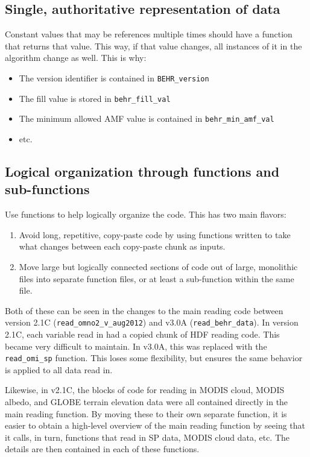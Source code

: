 \documentclass[12pt]{article}
\begin{document}
\subsection{Single, authoritative representation of data}
	Constant values that may be references multiple times should have a function that returns that value. This way, if that value changes, all instances of it in the algorithm change as well. This is why:
	\begin{itemize}
	\item The version identifier is contained in \lstinline$BEHR_version$
	\item The fill value is stored in \lstinline$behr_fill_val$
	\item The minimum allowed AMF value is contained in \lstinline$behr_min_amf_val$
	\item etc.
	\end{itemize}
	
	
\subsection{Logical organization through functions and sub-functions}
	Use functions to help logically organize the code. This has two main flavors:	
	\begin{enumerate}
	\item Avoid long, repetitive, copy-paste code by using functions written to take what changes between each copy-paste chunk as inputs.
	\item Move large but logically connected sections of code out of large, monolithic files into separate function files, or at least a sub-function within the same file.
	\end{enumerate} 
	
	Both of these can be seen in the changes to the main reading code between version 2.1C (\lstinline$read_omno2_v_aug2012$) and v3.0A (\lstinline$read_behr_data$). In version 2.1C, each variable read in had a copied chunk of HDF reading code. This became very difficult to maintain. In v3.0A, this was replaced with the \lstinline$read_omi_sp$ function. This loses some flexibility, but ensures the same behavior is applied to all data read in.
	
	Likewise, in v2.1C, the blocks of code for reading in MODIS cloud, MODIS albedo, and GLOBE terrain elevation data were all contained directly in the main reading function. By moving these to their own separate function, it is easier to obtain a high-level overview of the main reading function by seeing that it calls, in turn, functions that read in SP data, MODIS cloud data, etc. The details are then contained in each of these functions.
	
\end{document}

